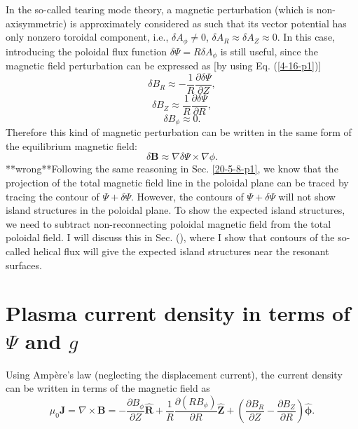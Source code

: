 \documentclass{article}
\newcommand{\tmmathbf}[1]{\ensuremath{\boldsymbol{#1}}}
\begin{document}
In the so-called tearing mode theory, a magnetic perturbation (which is
non-axisymmetric) is approximately considered as such that its vector
potential has only nonzero toroidal component, i.e., $\delta A_{\phi} \neq 0$,
$\delta A_R \approx \delta A_Z \approx 0$. In this case, introducing the
poloidal flux function $\delta \Psi = R \delta A_{\phi}$ is still useful,
since the magnetic field perturbation can be expressed as [by using Eq.
(\ref{4-16-p1})]
\begin{equation}
  \delta B_R \approx - \frac{1}{R} \frac{\partial \delta \Psi}{\partial Z},
\end{equation}
\begin{equation}
  \delta B_Z \approx \frac{1}{R} \frac{\partial \delta \Psi}{\partial R},
\end{equation}
\begin{equation}
  \delta B_{\phi} \approx 0.
\end{equation}
Therefore this kind of magnetic perturbation can be written in the same form
of the equilibrium magnetic field:
\begin{equation}
  \delta \mathbf{B} \approx \nabla \delta \Psi \times \nabla \phi .
\end{equation}
**wrong**Following the same reasoning in Sec. \ref{20-5-8-p1}, we know that
the projection of the total magnetic field line in the poloidal plane can be
traced by tracing the contour of $\Psi + \delta \Psi$. However, the contours
of $\Psi + \delta \Psi$ will not show island structures in the poloidal plane.
To show the expected island structures, we need to subtract non-reconnecting
poloidal magnetic field from the total poloidal field. I will discuss this in
Sec. (), where I show that contours of the so-called helical flux will give
the expected island structures near the resonant surfaces.

\section{Plasma current density in terms of $\Psi$ and $g$}

Using Amp{\`e}re's law (neglecting the displacement current), the current
density can be written in terms of the magnetic field as
\begin{equation}
  \label{3-11-p1} \mu_0 \mathbf{J}= \nabla \times \mathbf{B}= - \frac{\partial
  B_{\phi}}{\partial Z} \hat{\mathbf{R}} + \frac{1}{R} \frac{\partial (R
  B_{\phi})}{\partial R} \hat{\mathbf{Z}} + \left( \frac{\partial
  B_R}{\partial Z} - \frac{\partial B_Z}{\partial R} \right)
  \hat{\tmmathbf{\phi}} .
\end{equation}
\end{document}
